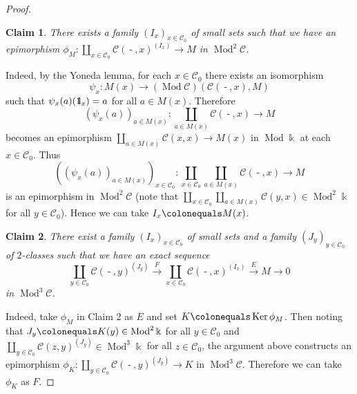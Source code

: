 \documentclass{surv-l}
\numberwithin{equation}{chapter}
\numberwithin{figure}{chapter}
\theoremstyle{plain}
\newtheorem{clm}{Claim}
\theoremstyle{definition}
\theoremstyle{remark}
\newcommand{\id}{1\kern-.25em{\text{{\rm l}}}}
\DeclareMathOperator{\Ker}{Ker}
\DeclareMathOperator{\Mod}{Mod}
\DeclareMathOperator{\blank}{-}
\begin{document}
\begin{proof}
\begin{clm}
There exists a family $(I_x)_{x \in {\mathcal{C}}_0}$ of small sets
such that we have an epimorphism
$\phi_M\colon \coprod_{x \in {\mathcal{C}}_0}{\mathcal{C}}(\blank, x)^{(I_x)} \to M$
in $\Mod^2{\mathcal{C}}$.
\end{clm}
Indeed, by the Yoneda lemma,
for each $x \in {\mathcal{C}}_0$ there exists an isomorphism
\[
\psi_{x} \colon M(x) \to (\Mod{\mathcal{C}})({\mathcal{C}}(\blank, x), M)
\]
such that $\psi_x(a)(\id_x)=a$ for all $a \in M(x)$.
Therefore
\[
(\psi_x(a))_{a\in M(x)} \colon \coprod_{a \in M(x)}{\mathcal{C}}(\blank, x) \to M
\]
becomes an epimorphism $\coprod_{a \in M(x)}{\mathcal{C}}(x, x) \to M(x)$
in $\Mod \Bbbk$ at each $x\in {\mathcal{C}}_0$.
Thus
\[
((\psi_x(a))_{a\in M(x)})_{x \in {\mathcal{C}}_0} \colon \coprod_{x \in {\mathcal{C}}_0}\coprod_{a \in M(x)}{\mathcal{C}}(\blank, x) \to M
\]
is an epimorphism in $\Mod^2 {\mathcal{C}}$
(note that $\coprod_{x \in {\mathcal{C}}_0}\coprod_{a \in M(x)}{\mathcal{C}}(y, x) \in \Mod^2\Bbbk$
for all $y \in {\mathcal{C}}_0$).
Hence we can take $I_x\colonequals  M(x)$.

\begin{clm}
There exist a family $(I_x)_{x \in {\mathcal{C}}_0}$ of small sets
and a family $(J_y)_{y \in {\mathcal{C}}_0}$ of $2$-classes
such that we have an exact sequence
\begin{equation}\label{eq:proj-pres}
\coprod_{y \in {\mathcal{C}}_0}{\mathcal{C}}(\blank, y)^{(J_y)} \xrightarrow{F} \coprod_{x \in {\mathcal{C}}_0}{\mathcal{C}}(\blank, x)^{(I_x)} \xrightarrow{E} M \to 0
\end{equation}
in $\Mod^3{\mathcal{C}}$.
\end{clm}

Indeed, take $\phi_M$ in Claim 2 as $E$ and set $K\colonequals  \Ker \phi_M$.
Then noting that $J_y\colonequals  K(y) \in \Mod^2 \Bbbk$ for all
$y \in {\mathcal{C}}_0$ and
$\coprod_{y \in {\mathcal{C}}_0}{\mathcal{C}}(z, y)^{(J_y)} \in \Mod^3 \Bbbk$ for all $z \in {\mathcal{C}}_0$,
the argument above constructs an epimorphism
$
\phi_K \colon \coprod_{y \in {\mathcal{C}}_0}{\mathcal{C}}(\blank, y)^{(J_y)} \to K
$
in $\Mod^3 {\mathcal{C}}$.
Therefore we can take $\phi_K$ as $F$.


\end{proof}
\end{document}
